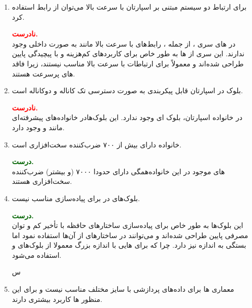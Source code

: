 \begin{enumerate}
	\item 
	برای ارتباط دو سیستم مبتنی بر اسپارتان  با سرعت بالا می‌توان از رابط  استفاده کرد.
	\begin{qsolve}
		\textbf{\textcolor{red}{نادرست.}}\\
		در  های سری ، از جمله ، رابط‌های با سرعت بالا مانند  به صورت داخلی وجود ندارند. این سری از  ها به طور خاص برای کاربردهای کم‌هزینه و با پیچیدگی پایین طراحی شده‌اند و معمولاً برای ارتباطات با سرعت بالا مناسب نیستند، زیرا فاقد  های پرسرعت هستند.
	\end{qsolve}
	
	
	
	
	\item 
بلوک  در اسپارتان قابل پیکربندی به صورت دسترسی تک کاناله و دوکاناله است.
	\begin{qsolve}
		\textbf{\textcolor{red}{نادرست.}}\\
		در خانواده اسپارتان، بلوک  ای وجود ندارد. این بلوک‌هادر خانواده‌های پیشرفته‌ای مانند  و  وجود دارد.
	\end{qsolve}
	
	
	
	
	\item 
خانواده  دارای بیش از ۷۰۰ ضرب‌کننده سخت‌افزاری است.
	\begin{qsolve}
		\textbf{\textcolor{darkgreen}{درست.}}\\
		\lr{FPGA}
		های موجود در این خانواده‌همگی دارای حدودا ۷۰۰۰ (و بیشتر) ضرب‌کننده سخت‌افزاری هستند.
	\end{qsolve}
	
	
	
	
	\item 
بلوک‌های  در  برای پیاده‌سازی  مناسب نیست.
	\begin{qsolve}
		\textbf{\textcolor{darkgreen}{درست.}}\\
	این بلوک‌ها به طور خاص برای پیاده‌سازی ساختارهای حافظه با تأخیر کم و توان مصرفی پایین طراحی شده‌اند و می‌توانند در ساختارهای  از آن‌ها استفاده نمود اما بستگی به اندازه  نیز دارد. چرا که برای هایی با اندازه بزرگ معمولا از بلوک‌های  و  استفاده می‌شود.
	\end{qsolve}
	
	
	س
	\item 
معماری ها برای داده‌های پردازشی با سایز مختلف مناسب نیست و برای این منظور ها کاربرد بیشتری دارند.


\end{enumerate}
